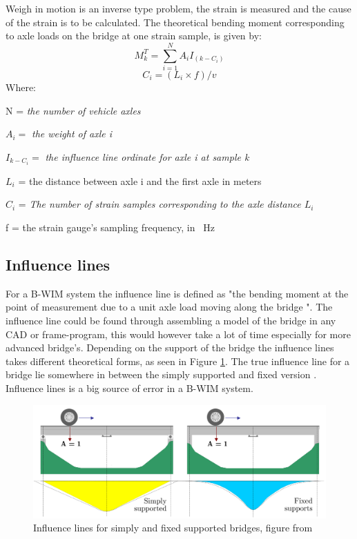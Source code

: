 Weigh in motion is an inverse type problem, the strain is measured and the cause of the strain is to be calculated. The theoretical bending moment corresponding to axle loads on the bridge at one strain sample, is given by:
\begin{equation}
M_k^T = \sum_{i = 1}^{N} A_i I_{(k-C_i)}
\label{equation:theoretical_strain}
\end{equation}
\begin{equation}
C_i = (L_i \times f)/v
\end{equation}
Where:
\begin{description}
	\item N = \textit{the number of vehicle axles}
	\item $A_i = $ \textit{the weight of axle i}
	\item $I_{k-C_i} = $ \textit{the influence line ordinate for axle i at sample k}
	\item $L_i$ = the distance between axle i and the first axle in meters
	\item $C_i$  = \textit{The number of strain samples corresponding to the axle distance $L_i$}
	\item f = the strain gauge's sampling frequency, in \SI{}{\Hz}
\end{description}

\subsection{Influence lines}
For a B-WIM system the influence line is defined as "the bending moment at the point of measurement due to a unit axle load moving along the bridge \cite{bwim_an_overview}". The influence line could be found through assembling a model of the bridge in any CAD or frame-program, this would however take a lot of time especially for more advanced bridge's. Depending on the support of the bridge the influence lines takes different theoretical forms, as seen in Figure \ref{fig:theoreticalInfl}. The true influence line for a bridge lie somewhere in between the simply supported and fixed version \cite[p.~146]{bwim_an_overview}.
Influence lines is a big source of error in a B-WIM system.
\begin{figure}[h]
\centering
\includegraphics[scale=0.5]{figures/inflLinesQuilligan}
\caption{Influence lines for simply and fixed supported bridges, figure from \cite{Quilligan}}
\label{fig:theoreticalInfl}
\end{figure}

